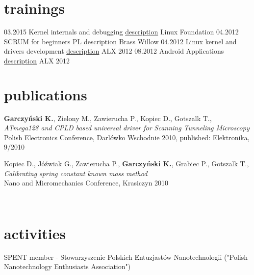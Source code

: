 \documentclass[]{friggeri-cv}
\begin{document}
\section{trainings}
\begin{entrylist}
	\entry
		{03.2015}
		{Kernel internals and debugging}
		{\href{http://training.linuxfoundation.org/linux-courses/development-training/linux-kernel-internals-and-debugging}{description}}
		{Linux Foundation}
	\entry
		{04.2012}
		{SCRUM for beginners}
		{\href{http://brasswillow.pl/warsztaty-i-szkolenia/wstep-do-scrum/}{PL description}}
		{Brass Willow}
	\entry
		{04.2012}
		{Linux kernel and drivers development}
		{\href{http://www.alx.pl/en/courses/linux-driver-development/}{description}}
		{ALX 2012}
	\entry
		{08.2012}
		{Android Applications}
		{\href{http://www.alx.pl/en/courses/android-101-201/}{description}}
		{ALX 2012}		
\end{entrylist}

\section{publications}
  \entry
    {\textbf{Garczyński K.}, Zielony M., Zawierucha P., Kopiec D., Gotszalk T., \\}
    {\textit{ATmega128 and CPLD based universal driver for Scanning Tunneling Microscopy} \\ }
    {Polish Electronics Conference, Darlówko Wschodnie 2010, published: Elektronika, 9/2010}


  \entry
    {Kopiec D., Jóźwiak G., Zawierucha P., \textbf{Garczyński K.}, Grabiec P., Gotszalk T., \\}
	{\textit{Calibrating spring constant known mass method} \\ }
    {Nano and Micromechanics Conference, Krasiczyn 2010}
    
    \\
\section{activities}
	SPENT member - Stowarzyszenie Polskich Entuzjastów Nanotechnologii ("Polish Nanotechnology Enthusiasts Association")
\end{document}
